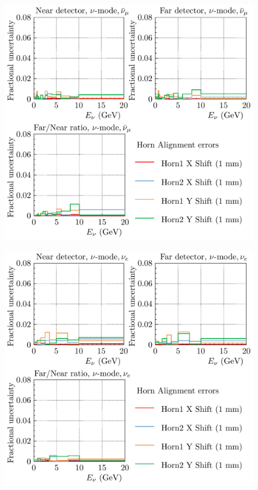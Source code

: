 \documentclass{article}
\begin{document}
\begin{figure}
  \includegraphics[width=\textwidth]{plots/fracerrs/numode_numubar_HornAlignment}
  \caption{}
  \label{fig:hornalign_nu_numubar}
\end{figure}

\begin{figure}
  \includegraphics[width=\textwidth]{plots/fracerrs/numode_nue_HornAlignment}
  \caption{}
  \label{fig:hornalign_nu_nue}
\end{figure}
\end{document}
